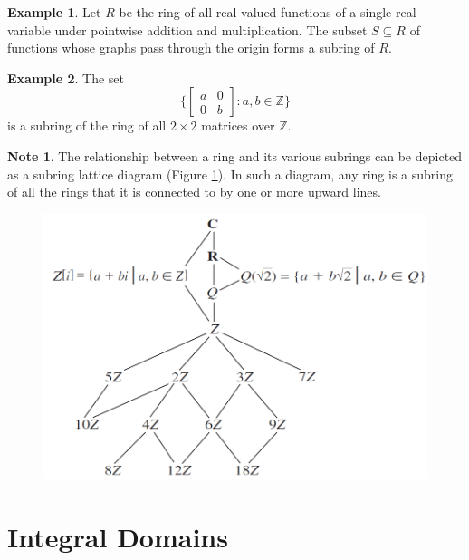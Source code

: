 \documentclass{article}
\theoremstyle{definition}
\newtheorem{example}{Example}[section]
\newtheorem{note}{Note}[section]
\begin{document}
    \begin{example}
        Let $R$ be the ring of all real-valued functions of a single real variable under pointwise addition and multiplication. The subset $S\subseteq R$ of functions whose graphs pass through the origin forms a subring of $R$.
    \end{example}
    
    \begin{example}
        The set
        \begin{equation*}
        \bigg\{
            \begin{bmatrix}
               a & 0 \\ 0 & b
            \end{bmatrix}
            : a,b\in\mathbb{Z}\bigg\}
        \end{equation*}
        is a subring of the ring of all $2\times2$ matrices over $\mathbb{Z}$.
    \end{example}
    
    \begin{note}
        The relationship between a ring and its various subrings can be depicted as a subring lattice diagram (Figure \ref{subring-lattice-diagram}). In such a diagram, any ring is a subring of all the rings that it is connected to by one or more upward lines.
    \end{note}
    
    \begin{figure}[!htbp]
        \centering
        \includegraphics[width=0.7\linewidth]{figures/subring-lattice-diagram.png}
        \caption{}
        \label{subring-lattice-diagram}
    \end{figure}
    
\section{Integral Domains}
\end{document}
